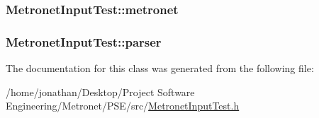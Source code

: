 \subsubsection[{\texorpdfstring{metronet}{metronet}}]{ Metronet\+Input\+Test\+::metronet\hspace{0.3cm}{\ttfamily [protected]}}\hypertarget{class_metronet_input_test_ab922ed7c2e4f1dfee1ed7df1eb3a13b4}{}\label{class_metronet_input_test_ab922ed7c2e4f1dfee1ed7df1eb3a13b4}
\subsubsection[{\texorpdfstring{parser}{parser}}]{ Metronet\+Input\+Test\+::parser\hspace{0.3cm}{\ttfamily [protected]}}\hypertarget{class_metronet_input_test_a64156aed860b2b3466c123e0432ad155}{}\label{class_metronet_input_test_a64156aed860b2b3466c123e0432ad155}


The documentation for this class was generated from the following file\+:\begin{DoxyCompactItemize}
\item 
/home/jonathan/\+Desktop/\+Project Software Engineering/\+Metronet/\+P\+S\+E/src/\hyperlink{_metronet_input_test_8h}{Metronet\+Input\+Test.\+h}\end{DoxyCompactItemize}
